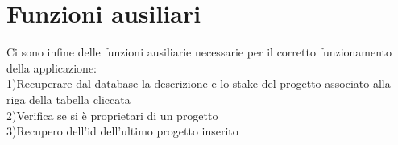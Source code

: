 \documentclass[12pt]{article}
\begin{document}
\section {Funzioni ausiliari}

Ci sono infine delle funzioni ausiliarie necessarie per il corretto funzionamento della applicazione:\\
1)Recuperare dal database la descrizione e lo stake del progetto associato alla riga della tabella cliccata\\
2)Verifica se si è proprietari di un progetto\\
3)Recupero dell'id dell'ultimo progetto inserito\\
\end{document}
